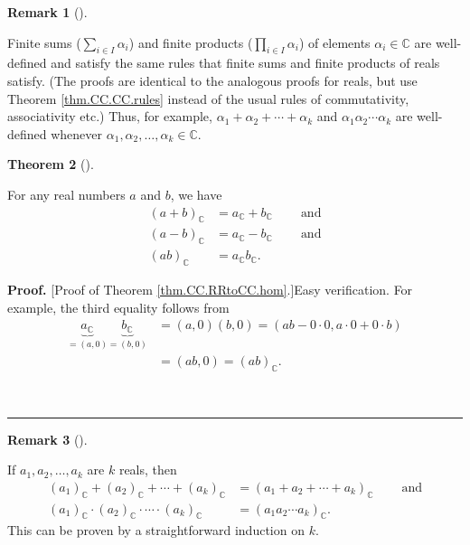 \documentclass[numbers=enddot,12pt,final,onecolumn,notitlepage]{scrartcl}%
\numberwithin{exer}{subsection}
\theoremstyle{definition}
\newtheorem{theo}{Theorem}[subsection]
\newenvironment{theorem}[1][]
{\begin{theo}[#1]\begin{leftbar}}
{\end{leftbar}\end{theo}}
\newtheorem{remk}[theo]{Remark}
\newenvironment{remark}[1][]
{\begin{remk}[#1]\begin{leftbar}}
{\end{leftbar}\end{remk}}
\newenvironment{proof}[1][Proof]{\noindent\textbf{#1.} }{\ \rule{0.5em}{0.5em}}
\let\sumnonlimits\sum
\let\prodnonlimits\prod
\renewcommand{\sum}{\sumnonlimits\limits}
\renewcommand{\prod}{\prodnonlimits\limits}
\begin{document}
\begin{remark}
Finite sums ($\sum_{i\in I}\alpha_{i}$) and finite products ($\prod_{i\in
I}\alpha_{i}$) of elements $\alpha_{i}\in\mathbb{C}$ are well-defined and
satisfy the same rules that finite sums and finite products of reals satisfy.
(The proofs are identical to the analogous proofs for reals, but use Theorem
\ref{thm.CC.CC.rules} instead of the usual rules of commutativity,
associativity etc.) Thus, for example, $\alpha_{1}+\alpha_{2}+\cdots
+\alpha_{k}$ and $\alpha_{1}\alpha_{2}\cdots\alpha_{k}$ are well-defined
whenever $\alpha_{1},\alpha_{2},\ldots,\alpha_{k}\in\mathbb{C}$.
\end{remark}

\begin{theorem}
\label{thm.CC.RRtoCC.hom}For any real numbers $a$ and $b$, we have%
\begin{align*}
\left(  a+b\right)  _{\mathbb{C}}  &  =a_{\mathbb{C}}+b_{\mathbb{C}%
}\ \ \ \ \ \ \ \ \ \ \text{and}\\
\left(  a-b\right)  _{\mathbb{C}}  &  =a_{\mathbb{C}}-b_{\mathbb{C}%
}\ \ \ \ \ \ \ \ \ \ \text{and}\\
\left(  ab\right)  _{\mathbb{C}}  &  =a_{\mathbb{C}}b_{\mathbb{C}}.
\end{align*}

\end{theorem}

\begin{proof}
[Proof of Theorem \ref{thm.CC.RRtoCC.hom}.]Easy verification. For example, the
third equality follows from%
\begin{align*}
\underbrace{a_{\mathbb{C}}}_{=\left(  a,0\right)  }\underbrace{b_{\mathbb{C}}%
}_{=\left(  b,0\right)  }  &  =\left(  a,0\right)  \left(  b,0\right)
=\left(  ab-0\cdot0,a\cdot0+0\cdot b\right) \\
&  =\left(  ab,0\right)  =\left(  ab\right)  _{\mathbb{C}}.
\end{align*}

\end{proof}

\begin{remark}
\label{rmk.CC.RRtoCC.homk}If $a_{1},a_{2},\ldots,a_{k}$ are $k$ reals, then
\begin{align*}
\left(  a_{1}\right)  _{\mathbb{C}}+\left(  a_{2}\right)  _{\mathbb{C}}%
+\cdots+\left(  a_{k}\right)  _{\mathbb{C}}  &  =\left(  a_{1}+a_{2}%
+\cdots+a_{k}\right)  _{\mathbb{C}}\ \ \ \ \ \ \ \ \ \ \text{and}\\
\left(  a_{1}\right)  _{\mathbb{C}}\cdot\left(  a_{2}\right)  _{\mathbb{C}%
}\cdot\cdots\cdot\left(  a_{k}\right)  _{\mathbb{C}}  &  =\left(  a_{1}%
a_{2}\cdots a_{k}\right)  _{\mathbb{C}}.
\end{align*}
This can be proven by a straightforward induction on $k$.
\end{remark}
\end{document}
